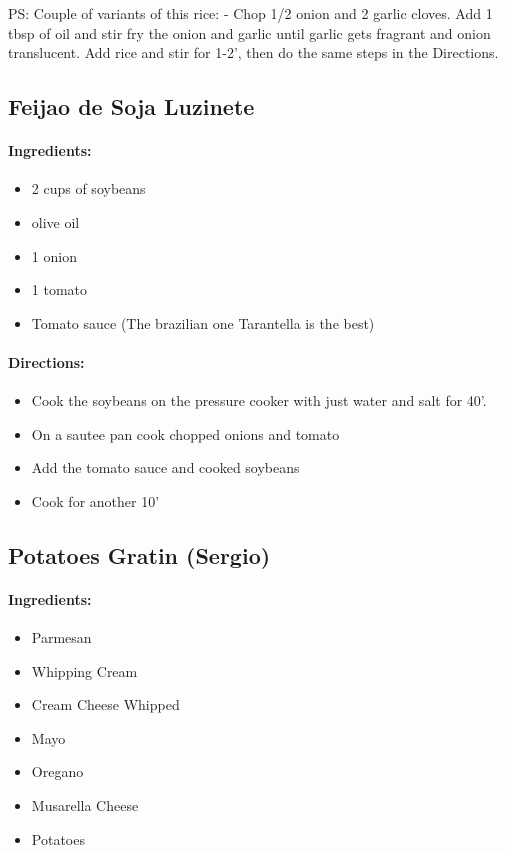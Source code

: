 \documentclass{article}
\begin{document}
PS: Couple of variants of this rice: - Chop 1/2 onion and 2 garlic cloves. Add 1 tbsp of oil and stir fry the onion and garlic until garlic gets fragrant and onion translucent. Add rice and stir for 1-2’, then do the same
steps in the Directions.

\subsection{Feijao de Soja Luzinete}

\paragraph{Ingredients:}

\begin{itemize}
	\item 2 cups of soybeans
	\item olive oil
	\item 1 onion
	\item 1 tomato
	\item Tomato sauce (The brazilian one Tarantella is the best)
\end{itemize}

\paragraph{Directions:}
\begin{itemize}
	\item Cook the soybeans on the pressure cooker with just water and salt for 40'.
	\item On a sautee pan cook chopped onions and tomato
	\item Add the tomato sauce and cooked soybeans
	\item Cook for another 10'
\end{itemize}

\subsection{Potatoes Gratin (Sergio)}

\paragraph{Ingredients:}

\begin{itemize}
	\item Parmesan
	\item Whipping Cream
	\item Cream Cheese Whipped
	\item Mayo
	\item Oregano
	\item Musarella Cheese
	\item Potatoes
\end{itemize}
\end{document}
